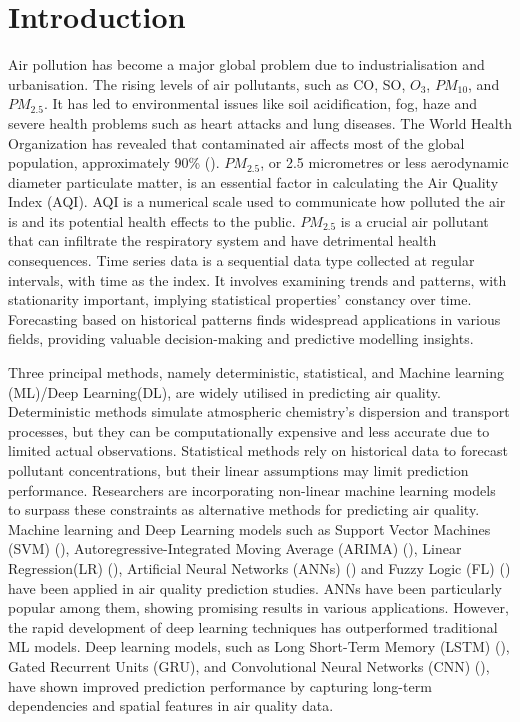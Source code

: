 \documentclass[a4paper, fleqn]{cas-sc}
\theoremstyle{definition}
\theoremstyle{remark}
\begin{document}
\maketitle

\section{Introduction}
Air pollution has become a major global problem due to industrialisation and urbanisation. The rising levels of air pollutants,  such as CO,  SO,  $O_3$,  $PM_{10}$,  and $PM_{2.5}$. It has led to environmental issues like soil acidification,  fog, haze and severe health problems such as heart attacks and lung diseases. The World Health Organization has revealed that contaminated air affects most of the global population,  approximately 90\% (\cite{zhou2019effects}). $PM_{2.5}$,  or 2.5 micrometres or less aerodynamic diameter particulate matter, is an essential factor in calculating the Air Quality Index (AQI). AQI is a numerical scale used to communicate how polluted the air is and its potential health effects to the public. $PM_{2.5}$ is a crucial air pollutant that can infiltrate the respiratory system and have detrimental health consequences. Time series data is a sequential data type collected at regular intervals, with time as the index. It involves examining trends and patterns,  with stationarity important, implying statistical properties' constancy over time. Forecasting based on historical patterns finds widespread applications in various fields,  providing valuable decision-making and predictive modelling insights.

Three principal methods,  namely deterministic,  statistical,  and Machine learning (ML)/Deep Learning(DL),  are widely utilised in predicting air quality. Deterministic methods simulate atmospheric chemistry's dispersion and transport processes,  but they can be computationally expensive and less accurate due to limited actual observations. Statistical methods rely on historical data to forecast pollutant concentrations,  but their linear assumptions may limit prediction performance. Researchers are incorporating non-linear machine learning models to surpass these constraints as alternative methods for predicting air quality. Machine learning and Deep Learning models such as Support Vector Machines (SVM) (\cite{lin2011forecasting}), Autoregressive-Integrated Moving Average (ARIMA) (\cite{kumari2022machine}),  Linear Regression(LR) (\cite{kumari2022deep}),  Artificial Neural Networks (ANNs) (\cite{taylan2017modelling}) and Fuzzy Logic (FL) (\cite{wang2015model}) have been applied in air quality prediction studies. ANNs have been particularly popular among them,  showing promising results in various applications. However,  the rapid development of deep learning techniques has outperformed traditional ML models. Deep learning models,  such as Long Short-Term Memory (LSTM) (\cite{kristiani2022short}),  Gated Recurrent Units (GRU),  and Convolutional Neural Networks (CNN) (\cite{ayturan2018air}),  have shown improved prediction performance by capturing long-term dependencies and spatial features in air quality data.
\end{document}
